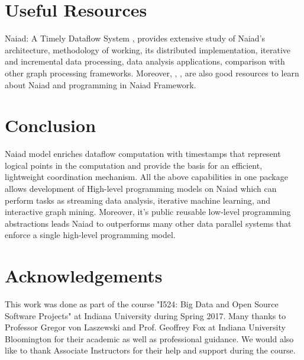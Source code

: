 \documentclass[9pt,twocolumn,twoside]{../../styles/osajnl}
\begin{document}
\section{Useful Resources}
Naiad: A Timely Dataflow System \cite{paper1-Naiad}, provides
extensive study of Naiad's architecture, methodology of working, its
distributed implementation, iterative and incremental data processing,
data analysis applications, comparison with other graph processing
frameworks. Moreover, \cite{github-Naiad}, \cite{www-Nuget},
\cite{paper2-Naiad} are also good resources to learn about Naiad and
programming in Naiad Framework.

\section{Conclusion}
Naiad model enriches \GE dataflow computation with timestamps that
represent logical points in the computation and provide the basis for
an efficient, lightweight coordination mechanism. All the above
capabilities in one package allows development of High-level
programming models on Naiad which can perform tasks as streaming data
analysis, iterative machine learning, and interactive graph
mining. Moreover, it’s \TE public reusable low-level programming
abstractions leads Naiad to outperforms many other data parallel
systems that enforce a single high-level programming model.

\section*{Acknowledgements}

This work was done as part of the course "I524: Big Data and Open
Source Software Projects" at Indiana University during Spring
2017. Many thanks to Professor Gregor von Laszewski and Prof. Geoffrey
Fox at Indiana University Bloomington for their academic as well as
professional guidance. We would also like to thank Associate
Instructors for their help and support during the course.


\end{document}

